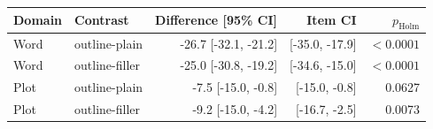 \begin{tabular}{llrrr}
\toprule Domain & Contrast & Difference [95\% CI] & Item CI & $p_{\mathrm{Holm}}$ \\
\midrule
Word & outline-plain & -26.7 [-32.1, -21.2] & [-35.0, -17.9] & $<0.0001$ \\
Word & outline-filler & -25.0 [-30.8, -19.2] & [-34.6, -15.0] & $<0.0001$ \\
Plot & outline-plain & -7.5 [-15.0, -0.8] & [-15.0, -0.8] & 0.0627 \\
Plot & outline-filler & -9.2 [-15.0, -4.2] & [-16.7, -2.5] & 0.0073 \\
\bottomrule
\end{tabular}
